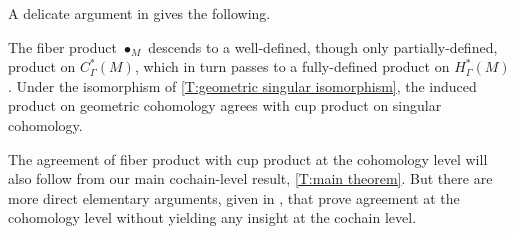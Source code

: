 A delicate argument in \cite{medina2022foundations} gives the following.

\begin{theorem}\label{P:product}
	The fiber product $\bullet_M$ descends to a well-defined, though only partially-defined, product on $C_\Gamma^*(M)$, which in turn passes to a fully-defined product on $H_\Gamma^*(M)$.
	Under the isomorphism of \cref{T:geometric singular isomorphism}, the induced product on geometric cohomology agrees with cup product on singular cohomology.
\end{theorem}

The agreement of fiber product with cup product at the cohomology level will also follow from our main cochain-level result, \cref{T:main theorem}.
But there are more direct elementary arguments, given in \cite{medina2022foundations}, that prove agreement at the cohomology level without yielding any insight at the cochain level.